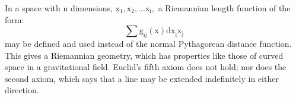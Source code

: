 In a space with n dimensions, $ \mathrm{x}_1, \mathrm{x}_2, ... \mathrm{x}_{\mathrm{i}} , $ 
a Riemannian length function of the form:
\[ \sum \mathrm{g}_{\mathrm{ij}} \mathrm{ (x)dx } _{\mathrm{i}} \mathrm{x}_{\mathrm{j}} \]
may be defined and used instead of the normal Pythagorean distance function. This 
gives a Riemannian geometry, which has properties like those of curved space
in a gravitational field. Euclid's fifth axiom does not hold; nor does the
second axiom, which says that a line may be extended indefinitely in either direction.